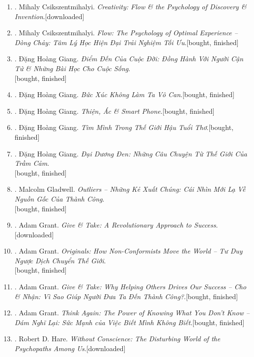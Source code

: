 \documentclass{article}
\begin{document}
\begin{enumerate}
	\item \cite{Csikszentmihalyi2013}. Mihaly Csikszentmihalyi. \textit{Creativity: Flow \& the Psychology of Discovery \& Invention}.\hfill\textsf{[downloaded]} 
	\item \cite{Csikszentmihalyi2021}. Mihaly Csikszentmihalyi. \textit{Flow: The Psychology of Optimal Experience -- Dòng Chảy: Tâm Lý Học Hiện Đại Trải Nghiệm Tối Ưu}.\hfill\textsf{[bought, finished]}
	\item \cite{Giang2022a}. Đặng Hoàng Giang. \textit{Điểm Đến Của Cuộc Đời: Đồng Hành Với Người Cận Tử \& Những Bài Học Cho Cuộc Sống}.\\\mbox{}\hfill\textsf{[bought, finished]}
	\item \cite{Giang2022b}. Đặng Hoàng Giang. \textit{Bức Xúc Không Làm Ta Vô Can}.\hfill\textsf{[bought, finished]}
	\item \cite{Giang2022c}. Đặng Hoàng Giang. \textit{Thiện, Ác \& Smart Phone}.\hfill\textsf{[bought, finished]}
	\item \cite{Giang2022d}. Đặng Hoàng Giang. \textit{Tìm Mình Trong Thế Giới Hậu Tuổi Thơ}.\hfill\textsf{[bought, finished]}
	\item \cite{Giang2023}. Đặng Hoàng Giang. \textit{Đại Dương Đen: Những Câu Chuyện Từ Thế Giới Của Trầm Cảm}.\\\mbox{}\hfill\textsf{[bought, finished]}
	\item \cite{Gladwell2022}. Malcolm Gladwell. \textit{Outliers -- Những Kẻ Xuất Chúng: Cái Nhìn Mới Lạ Về Nguồn Gốc Của Thành Công}.\\\mbox{}\hfill\textsf{[bought, finished]}
	\item \cite{Grant2013}. Adam Grant. \textit{Give \& Take: A Revolutionary Approach to Success}.\hfill\textsf{[downloaded]}
	\item \cite{Grant2020}. Adam Grant. \textit{Originals: How Non-Conformists Move the World -- Tư Duy Ngược Dịch Chuyển Thế Giới}.\\\mbox{}\hfill\textsf{[bought, finished]}
	\item \cite{Grant2022a}. Adam Grant. \textit{Give \& Take: Why Helping Others Drives Our Success -- Cho \& Nhận: Vì Sao Giúp Người Đưa Ta Đến Thành Công?}.\hfill\textsf{[bought, finished]}
	\item \cite{Grant2022b}. Adam Grant. \textit{Think Again: The Power of Knowing What You Don't Know -- Dám Nghĩ Lại: Sức Mạnh của Việc Biết Mình Không Biết}.\hfill\textsf{[bought, finished]}
	\item \cite{Hare1999}. Robert D. Hare. \textit{Without Conscience: The Disturbing World of the Psychopaths Among Us}.\hfill\textsf{[downloaded]}

\end{enumerate}
\end{document}
